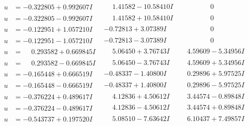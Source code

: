 \documentclass[1p]{elsarticle_modified}
\theoremstyle{definition}
\begin{document}
$$\begin{array}{c|c|c}
\begin{aligned}
u &= -0.322805 + 0.992607 I\end{aligned}
 & \phantom{-}1.41582 - 10.58410 I & \phantom{-0.000000 } 0 \\ \hline\begin{aligned}
u &= -0.322805 - 0.992607 I\end{aligned}
 & \phantom{-}1.41582 + 10.58410 I & \phantom{-0.000000 } 0 \\ \hline\begin{aligned}
u &= -0.122951 + 1.057210 I\end{aligned}
 & -0.72813 + 3.07389 I & \phantom{-0.000000 } 0 \\ \hline\begin{aligned}
u &= -0.122951 - 1.057210 I\end{aligned}
 & -0.72813 - 3.07389 I & \phantom{-0.000000 } 0 \\ \hline\begin{aligned}
u &= \phantom{-}0.293582 + 0.669845 I\end{aligned}
 & \phantom{-}5.06450 + 3.76743 I & \phantom{-}4.59609 - 5.34956 I \\ \hline\begin{aligned}
u &= \phantom{-}0.293582 - 0.669845 I\end{aligned}
 & \phantom{-}5.06450 - 3.76743 I & \phantom{-}4.59609 + 5.34956 I \\ \hline\begin{aligned}
u &= -0.165448 + 0.666519 I\end{aligned}
 & -0.48337 - 1.40800 I & \phantom{-}0.29896 + 5.97525 I \\ \hline\begin{aligned}
u &= -0.165448 - 0.666519 I\end{aligned}
 & -0.48337 + 1.40800 I & \phantom{-}0.29896 - 5.97525 I \\ \hline\begin{aligned}
u &= -0.376224 + 0.489617 I\end{aligned}
 & \phantom{-}4.12836 + 4.50612 I & \phantom{-}3.44574 - 0.89848 I \\ \hline\begin{aligned}
u &= -0.376224 - 0.489617 I\end{aligned}
 & \phantom{-}4.12836 - 4.50612 I & \phantom{-}3.44574 + 0.89848 I \\ \hline\begin{aligned}
u &= -0.543737 + 0.197520 I\end{aligned}
 & \phantom{-}5.08510 - 7.63642 I & \phantom{-}6.10437 + 7.49857 I \\ \hline\begin{aligned}

\end{aligned}
\end{array}$$
\end{document}
